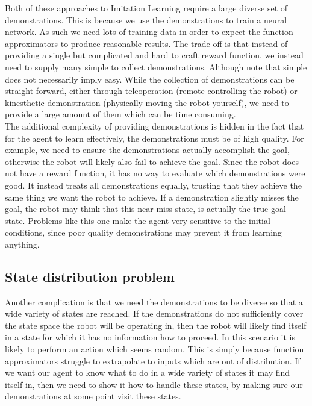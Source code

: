 Both of these approaches to Imitation Learning require a large diverse set of demonstrations. This is because we use the demonstrations to train a neural network. As such we need lots of training data in order to expect the function approximators to produce reasonable results. The trade off is that instead of providing a single but complicated and hard to craft reward function, we instead need to supply many simple to collect demonstrations. Although note that simple does not necessarily imply easy. While the collection of demonstrations can be straight forward, either through teleoperation (remote controlling the robot) or kinesthetic demonstration (physically moving the robot yourself), we need to provide a large amount of them which can be time consuming.\\

The additional complexity of providing demonstrations is hidden in the fact that for the agent to learn effectively, the demonstrations must be of high quality. For example, we need to ensure the demonstrations actually accomplish the goal, otherwise the robot will likely also fail to achieve the goal. Since the robot does not have a reward function, it has no way to evaluate which demonstrations were good. It instead treats all demonstrations equally, trusting that they achieve the same thing we want the robot to achieve. If a demonstration slightly misses the goal, the robot may think that this near miss state, is actually the true goal state. Problems like this one make the agent very sensitive to the initial conditions, since poor quality demonstrations may prevent it from learning anything.\\


\subsection{State distribution problem}
Another complication is that we need the demonstrations to be diverse so that a wide variety of states are reached. If the demonstrations do not sufficiently cover the state space the robot will be operating in, then the robot will likely find itself in a state for which it has no information how to proceed. In this scenario it is likely to perform an action which seems random. This is simply because function approximators struggle to extrapolate to inputs which are out of distribution. If we want our agent to know what to do in a wide variety of states it may find itself in, then we need to show it how to handle these states, by making sure our demonstrations at some point visit these states.\\

